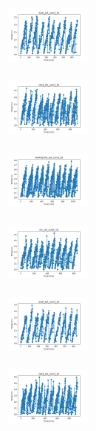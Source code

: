 \begin{figure}[H]
\begin{subfigure}
        \centering
        \includegraphics[width=0.234\textwidth]{img/bmb/ecoli_set_const_10_589741062_time.png}
    \end{subfigure}
    \hfill
    \begin{subfigure}
        \centering
        \includegraphics[width=0.234\textwidth]{img/bmb/rand_set_const_10_589741062_time.png}
    \end{subfigure}
    \hfill
    \begin{subfigure}
        \centering
        \includegraphics[width=0.234\textwidth]{img/bmb/newthyroid_set_const_10_589741062_time.png}
    \end{subfigure}
    \hfill
    \begin{subfigure}
        \centering
        \includegraphics[width=0.234\textwidth]{img/bmb/iris_set_const_10_277451237_time.png}
    \end{subfigure}
    \hfill
    \begin{subfigure}
        \centering
        \includegraphics[width=0.234\textwidth]{img/bmb/ecoli_set_const_10_277451237_time.png}
    \end{subfigure}
    \hfill
    \begin{subfigure}
        \centering
        \includegraphics[width=0.234\textwidth]{img/bmb/rand_set_const_10_277451237_time.png}

\end{subfigure}
\end{figure}
